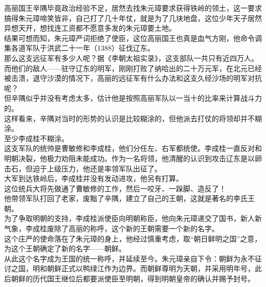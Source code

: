 \begin{multicols}{\theparacolNo}
高丽国王辛隅毕竟政治经验不足，居然去找朱元璋要求获得铁岭的领土，这一要求搞得朱元璋啼笑皆非，自己打了几十年仗，就是为了几块地盘，这位少年天子居然异想天开，想找连工资都不愿意多发的朱元璋要土地。\\

结果可想而知，朱元璋严词拒绝了使臣，这位高丽国王也真是血气方刚，他命令调集各道军队于洪武二十一年（1388）征伐辽东。\\

那么这支远征军有多少人呢？据《李朝太祖实录》，这支部队一共只有近四万人。而他们的敌人——驻守辽东的明军，刚刚打败了纳哈出的二十万元军，在北元已经被击溃，退守沙漠的情况下，高丽的远征军有什么办法和这支久经沙场的明军对抗呢？\\

但辛隅似乎并没有考虑太多，估计他是按照高丽军队以一当十的比率来计算战斗力的。\\

这样看来，辛隅对当时的形势的认识是比较糊涂的，但他派去打仗的将领却并不糊涂。\\

至少李成桂不糊涂。\\

这支军队的统帅是曹敏修和李成桂，他们分任左、右军都统使。李成桂一直反对和明朝决裂，他极力劝阻未能成功。作为一名将领，他清醒的认识到攻击辽东是以卵击石，但迫于上级压力，他还是率领军队出征了。\\

大军到达铁岭后，李成桂并没有发动进攻，他另有打算。\\

这位统兵大将先做通了曹敏修的工作，然后一咬牙、一跺脚、造反了！\\

他带领军队打回了老家，废黜了辛隅，建立了自己的王朝，这就是著名的李氏王朝。\\

为了争取明朝的支持，李成桂派使臣向明朝称臣，他向朱元璋递交了国书，新人新气象，李成桂废除了高丽的称呼，这个新的王朝需要一个新的名字。\\

这个庄严的使命落在了朱元璋的身上，他经过慎重考虑，取“朝日鲜明之国”之意，为这个王朝确定了新的名字——朝鲜。\\

从此这个名字成为王国的统一称呼，并延续至今。朱元璋亲自下令：朝鲜为永不征讨之国，明和朝鲜正式以鸭绿江作为边界。而朝鲜尊明为天朝，并采用明年号，此后朝鲜的历代国王继位后都要派使臣至明朝，得到明朝皇帝的确认并赐予封号。\\


\end{multicols}
